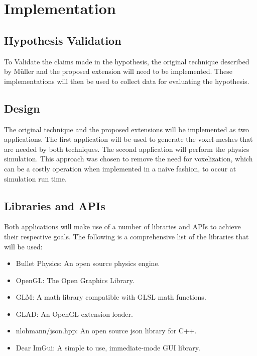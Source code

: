 

\section{Implementation}
\subsection{Hypothesis Validation}

To Validate the claims made in the hypothesis, the original technique described by Müller \etal and
the proposed extension will need to be implemented. These implementations will then be used to 
collect data for evaluating the hypothesis.

\subsection{Design}

The original technique and the proposed extensions will be implemented as two applications. The 
first application will be used to generate the voxel-meshes that are needed by both techniques. The
second application will perform the physics simulation. This approach was chosen to remove the need
for voxelization, which can be a costly operation when implemented in a naive fashion, to occur at
simulation run time.

\subsection{Libraries and APIs}

Both applications will make use of a number of libraries and APIs to achieve their respective goals. 
The following is a comprehensive list of the libraries that will be used:

\begin{itemize}
  \item Bullet Physics: An open source physics engine.
  \item OpenGL: The Open Graphics Library.
  \item GLM: A math library compatible with GLSL math functions.
  \item GLAD: An OpenGL extension loader.
  \item nlohmann/json.hpp: An open source json library for C++.
  \item Dear ImGui: A simple to use, immediate-mode GUI library.
\end{itemize}

